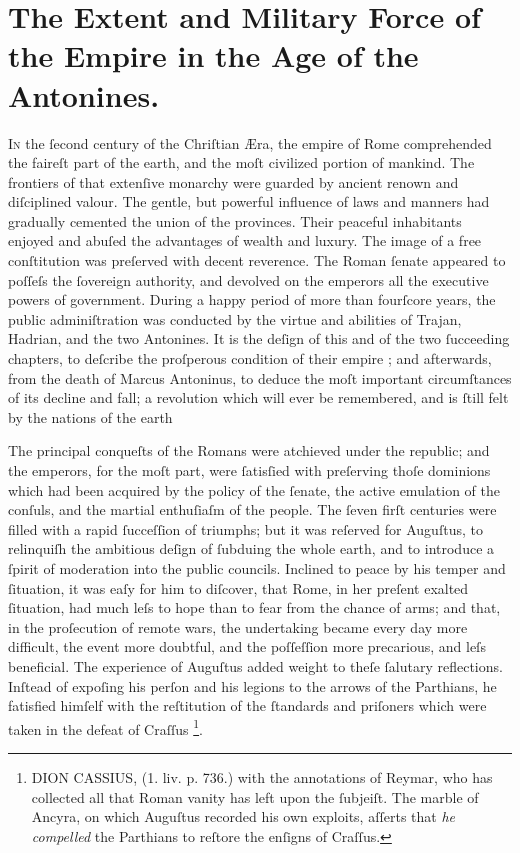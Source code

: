 \chapter{The Extent and Military Force of the Empire in the Age  of the Antonines.}




\lettrine[lines=3]{I}n the ſecond century of the Chriſtian Æra, the empire of Rome comprehended the faireſt part of the earth, and the moſt civilized portion of mankind. The frontiers of that extenſive monarchy were guarded by ancient renown and diſciplined valour. The gentle, but powerful influence of laws and manners had gradually cemented the union of the provinces. Their peaceful inhabitants enjoyed and abuſed the advantages of wealth and luxury. The image of a free conſtitution was preſerved with decent reverence. The Roman ſenate appeared to poſſeſs the ſovereign authority, and devolved on the emperors all the executive powers of government.  During a happy period of more than fourſcore years, the public adminiſtration was conducted by the virtue and abilities of Trajan, Hadrian, and the two Antonines. It is the deſign of this and of the two ſucceeding chapters, to deſcribe the proſperous condition of their empire ; and afterwards, from the death of Marcus Antoninus, to deduce the moſt important circumſtances of its decline and fall; a revolution which will ever be remembered, and is ſtill felt by the nations of the earth

 The principal conqueſts of the Romans were atchieved under the republic; and the emperors, for the moſt part, were ſatisſied with preſerving thoſe dominions which had been acquired by the policy of the ſenate, the active emulation of the conſuls, and the martial enthuſiaſm of the people. The ſeven firſt centuries were filled with a rapid ſucceſſion of triumphs; but it was reſerved for Auguſtus, to relinquiſh the ambitious deſign of ſubduing the whole earth, and to introduce a ſpirit of moderation into the public councils. Inclined to peace by his temper and ſituation, it was eaſy for him to diſcover, that Rome, in her preſent exalted ſituation, had much leſs to hope than to fear from the chance of arms; and that, in the proſecution of remote wars, the undertaking became every day more difficult, the event more doubtful, and the poſſeſſion more precarious, and leſs beneficial. The experience of Auguſtus added weight to theſe ſalutary reflections. Inſtead of expoſing his perſon and his legions to the arrows of the Parthians, he fatisfied himſelf with the reſtitution of the ſtandards and priſoners which were taken in the defeat of Craſſus \footnote{\lettrine[lines=3]{D}ION CASSIUS, (1. liv. p. 736.) with the annotations of Reymar, who has collected all that Roman vanity has left upon the ſubjeiſt. The marble of Ancyra, on which Auguſtus recorded his own exploits, aſſerts that \emph{he compelled} the Parthians to reſtore the enſigns of Craſſus.}.






